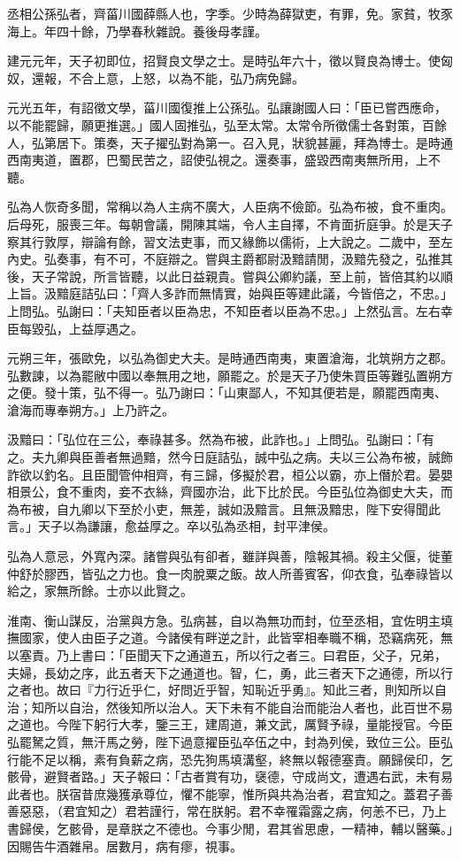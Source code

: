 
\begin{pinyinscope}
丞相公孫弘者，齊菑川國薛縣人也，字季。少時為薛獄吏，有罪，免。家貧，牧豕海上。年四十餘，乃學春秋雜說。養後母孝謹。

建元元年，天子初即位，招賢良文學之士。是時弘年六十，徵以賢良為博士。使匈奴，還報，不合上意，上怒，以為不能，弘乃病免歸。

元光五年，有詔徵文學，菑川國復推上公孫弘。弘讓謝國人曰：「臣已嘗西應命，以不能罷歸，願更推選。」國人固推弘，弘至太常。太常令所徵儒士各對策，百餘人，弘第居下。策奏，天子擢弘對為第一。召入見，狀貌甚麗，拜為博士。是時通西南夷道，置郡，巴蜀民苦之，詔使弘視之。還奏事，盛毀西南夷無所用，上不聽。

弘為人恢奇多聞，常稱以為人主病不廣大，人臣病不儉節。弘為布被，食不重肉。后母死，服喪三年。每朝會議，開陳其端，令人主自擇，不肯面折庭爭。於是天子察其行敦厚，辯論有餘，習文法吏事，而又緣飾以儒術，上大說之。二歲中，至左內史。弘奏事，有不可，不庭辯之。嘗與主爵都尉汲黯請閒，汲黯先發之，弘推其後，天子常說，所言皆聽，以此日益親貴。嘗與公卿約議，至上前，皆倍其約以順上旨。汲黯庭詰弘曰：「齊人多詐而無情實，始與臣等建此議，今皆倍之，不忠。」上問弘。弘謝曰：「夫知臣者以臣為忠，不知臣者以臣為不忠。」上然弘言。左右幸臣每毀弘，上益厚遇之。

元朔三年，張歐免，以弘為御史大夫。是時通西南夷，東置滄海，北筑朔方之郡。弘數諫，以為罷敝中國以奉無用之地，願罷之。於是天子乃使朱買臣等難弘置朔方之便。發十策，弘不得一。弘乃謝曰：「山東鄙人，不知其便若是，願罷西南夷、滄海而專奉朔方。」上乃許之。

汲黯曰：「弘位在三公，奉祿甚多。然為布被，此詐也。」上問弘。弘謝曰：「有之。夫九卿與臣善者無過黯，然今日庭詰弘，誠中弘之病。夫以三公為布被，誠飾詐欲以釣名。且臣聞管仲相齊，有三歸，侈擬於君，桓公以霸，亦上僭於君。晏嬰相景公，食不重肉，妾不衣絲，齊國亦治，此下比於民。今臣弘位為御史大夫，而為布被，自九卿以下至於小吏，無差，誠如汲黯言。且無汲黯忠，陛下安得聞此言。」天子以為謙讓，愈益厚之。卒以弘為丞相，封平津侯。

弘為人意忌，外寬內深。諸嘗與弘有卻者，雖詳與善，陰報其禍。殺主父偃，徙董仲舒於膠西，皆弘之力也。食一肉脫粟之飯。故人所善賓客，仰衣食，弘奉祿皆以給之，家無所餘。士亦以此賢之。

淮南、衡山謀反，治黨與方急。弘病甚，自以為無功而封，位至丞相，宜佐明主填撫國家，使人由臣子之道。今諸侯有畔逆之計，此皆宰相奉職不稱，恐竊病死，無以塞責。乃上書曰：「臣聞天下之通道五，所以行之者三。曰君臣，父子，兄弟，夫婦，長幼之序，此五者天下之通道也。智，仁，勇，此三者天下之通德，所以行之者也。故曰『力行近乎仁，好問近乎智，知恥近乎勇』。知此三者，則知所以自治；知所以自治，然後知所以治人。天下未有不能自治而能治人者也，此百世不易之道也。今陛下躬行大孝，鑒三王，建周道，兼文武，厲賢予祿，量能授官。今臣弘罷駑之質，無汗馬之勞，陛下過意擢臣弘卒伍之中，封為列侯，致位三公。臣弘行能不足以稱，素有負薪之病，恐先狗馬填溝壑，終無以報德塞責。願歸侯印，乞骸骨，避賢者路。」天子報曰：「古者賞有功，襃德，守成尚文，遭遇右武，未有易此者也。朕宿昔庶幾獲承尊位，懼不能寧，惟所與共為治者，君宜知之。蓋君子善善惡惡，（君宜知之）君若謹行，常在朕躬。君不幸罹霜露之病，何恙不已，乃上書歸侯，乞骸骨，是章朕之不德也。今事少閒，君其省思慮，一精神，輔以醫藥。」因賜告牛酒雜帛。居數月，病有瘳，視事。


\end{pinyinscope}
